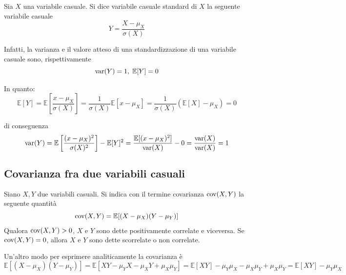            \begin{definition}
                Sia $X$ una variabile casuale.
                Si dice variabile casuale standard di $X$ la seguente variabile casuale
                \[
                    Y = \frac{X - \mu_{X}}{\sigma(X)}
                \]
            \end{definition}

            Infatti, la varianza e il valore atteso di una standardizzazione di una variabile casuale sono, rispettivamente
            \[
                \textnormal{var}(Y) = 1, \; \mathbb{E}[Y] = 0
            \]

            In quanto:
            \[
                \mathbb{E}[Y] = \mathbb{E}\left[\frac{x - \mu_{X}}{\sigma(X)}\right] = \frac{1}{\sigma(X)} \mathbb{E}[x - \mu_{X}] = \frac{1}{\sigma(X)} (\mathbb{E}[X] - \mu_{X}) = 0
            \]

            di conseguenza
            \[
                \textnormal{var}(Y) = \mathbb{E}\left[\frac{(x - \mu_{X})^{2}}{\sigma(X)^{2}}\right] - \mathbb{E}[Y]^{2} =
                \frac{\mathbb{E}[(x - \mu_{X})^{2}]}{\textnormal{var}(X)} - 0 =
                \frac{\textnormal{var}(X)}{\textnormal{var}(X)} =
                1
            \]

        \subsection{Covarianza fra due variabili casuali}
            \begin{definition}
                Siano $X, Y$ due variabili casuali.
                Si indica con il termine covarianza $\textnormal{cov}(X, Y)$ la seguente quantità
                \[
                    \textnormal{cov}(X, Y) = \mathbb{E}[(X - \mu_{X})(Y - \mu_{Y})]
                \]
                Qualora $\textnormal{cov}(X, Y) > 0$, $X$ e $Y$ sono dette positivamente correlate e viceversa.
                Se $\textnormal{cov}(X, Y) = 0$, allora $X$ e $Y$ sono dette scorrelate o non correlate.
            \end{definition}

            Un'altro modo per esprimere analiticamente la covarianza è
            \[
                \mathbb{E}[(X - \mu_{X})(Y - \mu_{Y})] = \mathbb{E}[XY - \mu_{Y}X - \mu_{X}Y + \mu_{X}\mu_{Y}] =
                \mathbb{E}[XY] - \mu_{Y}\mu_{X} - \mu_{X}\mu_{Y} + \mu_{X}\mu_{Y} =
                \mathbb{E}[XY] - \mu_{Y}\mu_{X}
            \]

